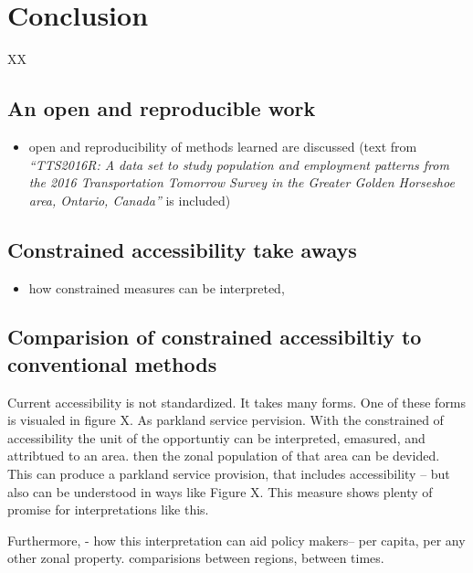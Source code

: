 \documentclass[
11pt, %
oneside, %
english, %
singlespacing, %
]{macthesis} %
\def\tightlist{}
\begin{document}
\chapter*{Conclusion}\label{conclusion-1}

XX

\section{An open and reproducible work}\label{an-open-and-reproducible-work}

\begin{itemize}
\tightlist
\item
  open and reproducibility of methods learned are discussed (text from \emph{``TTS2016R: A data set to study population and employment patterns from the 2016 Transportation Tomorrow Survey in the Greater Golden Horseshoe area, Ontario, Canada''} is included)
\end{itemize}

\section{Constrained accessibility take aways}\label{constrained-accessibility-take-aways}

\begin{itemize}
\tightlist
\item
  how constrained measures can be interpreted,
\end{itemize}

\section{Comparision of constrained accessibiltiy to conventional methods}\label{comparision-of-constrained-accessibiltiy-to-conventional-methods}

Current accessibility is not standardized. It takes many forms. One of these forms is visualed in figure X. As parkland service pervision. With the constrained of accessibility the unit of the opportuntiy can be interpreted, emasured, and attribtued to an area. then the zonal population of that area can be devided. This can produce a parkland service provision, that includes accessibility -- but also can be understood in ways like Figure X. This measure shows plenty of promise for interpretations like this.

Furthermore,
- how this interpretation can aid policy makers-- per capita, per any other zonal property. comparisions between regions, between times.
\end{document}
